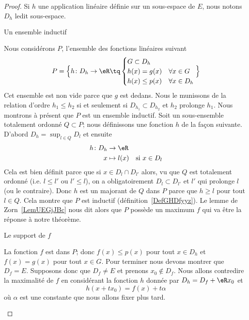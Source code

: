 \begin{proof}
    Si \( h\) une application linéaire définie sur un sous-espace de \( E\), nous notons \( D_h\) ledit sous-espace.

    \begin{subproof}
    \item[Un ensemble inductif]

        Nous considérons \( P\), l'ensemble des fonctions linéaires suivant
        \begin{equation}
            P=\Big\{  h\colon D_h\to \eR\tq
            \begin{cases}
                G\subset D_h\\
                h(x)=g(x)&\forall x\in G\\
                h(x)\leq p(x)&\forall x\in D_h
            \end{cases}
        \Big\}
        \end{equation}
        Cet ensemble est non vide parce que \( g\) est dedans. Nous le munissons de la relation d'ordre \( h_1\leq h_2\) si et seulement si \( D_{h_1}\subset D_{h_2}\) et \( h_2\) prolonge \( h_1\). Nous montrons à présent que \( P\) est un ensemble inductif. Soit un sous-ensemble totalement ordonné \( Q\subset P\); nous définissons une fonction \( h\) de la façon suivante. D'abord \( D_h=\sup_{l\in Q}D_l\) et ensuite
        \begin{equation}
            \begin{aligned}
                h\colon D_h&\to \eR \\
                x&\mapsto l(x)&\text{si } x\in D_l
            \end{aligned}
        \end{equation}
        Cela est bien définit parce que si \( x\in D_l\cap D_{l'}\) alors, vu que \( Q\) est totalement ordonné (i.e. \( l\leq l'\) ou \( l'\leq l\)), on a obligatoirement \( D_l\subset D_{l'}\) et \( l'\) qui prolonge \( l\) (ou le contraire). Donc \( h\) est un majorant de \( Q\) dans \( P\) parce que \( h\geq l\) pour tout \( l\in Q\). Cela montre que \( P\) est inductif (définition~\ref{DefGHDfyyz}). Le lemme de Zorn~\ref{LemUEGjJBc} nous dit alors que \( P\) possède un maximum \( f\) qui va être la réponse à notre théorème.

    \item[Le support de \( f\)]

        La fonction \( f\) est dans \( P\); donc \( f(x)\leq p(x)\) pour tout \( x\in D_h\) et \( f(x)=g(x)\) pour tout \( x\in G\). Pour terminer nous devons montrer que \( D_f=E\). Supposons donc que \( D_f\neq E\) et prenons \( x_0\notin D_f\). Nous allons contredire la maximalité de \( f\) en considérant la fonction \( h\) donnée par \( D_h=D_f+\eR x_0 \) et
        \begin{equation}
            h(x+tx_0)=f(x)+t\alpha
        \end{equation}
        où \( \alpha\) est une constante que nous allons fixer plus tard.


\end{subproof}
\end{proof}
